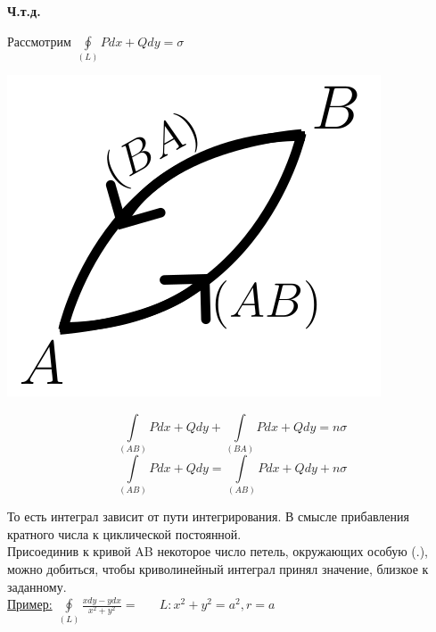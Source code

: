 \documentclass[12pt]{article}
\let\ORIincludegraphics\includegraphics
\renewcommand{\includegraphics}[2][]{\ORIincludegraphics[scale=0.65,#1]{#2}}
\let\oldint\int
\let\oldoint\oint
\renewcommand{\int}{\oldint\limits}
\renewcommand{\oint}{\oldoint\limits}
\begin{document}
  \vspace{1em}
  \begin{center}
    \textbf{Ч.т.д.}
  \end{center}
  Рассмотрим $\oint_{(L)} Pdx+Qdy=\sigma$\\
  \begin{minipage}{0.45\textwidth}
    \includegraphics[scale=0.6]{8.8.5.png}
  \end{minipage}
  \hspace{1em}
  \begin{minipage}{0.4\textwidth}
    \[\int_{(AB)}Pdx+Qdy+\int_{(BA)}Pdx+Qdy=n\sigma\]
    \[\int_{(AB)}Pdx+Qdy=\int_{(AB)}Pdx+Qdy+n\sigma\]
  \end{minipage}
  \vspace{1em}
  \par
  То есть интеграл зависит от пути интегрирования. В смысле прибавления кратного числа к циклической
  постоянной.\\
  Присоединив к кривой AB некоторое число петель, окружающих особую (.), можно добиться, чтобы криволинейный
  интеграл принял значение, близкое к заданному.\\
  \underline{Пример:} $\oint_{(L)} \frac{xdy-ydx}{x^2+y^2} \boxed{=} \hspace{20pt} L:x^2+y^2=a^2, r=a$\\
\end{document}
